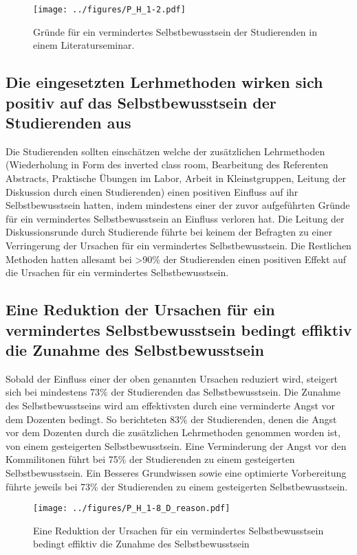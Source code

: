 \begin{figure}[h!]
\begin{center}
	\texttt{[image: ../figures/P\_H\_1-2.pdf]}
\end{center}
	\caption{Gründe für ein vermindertes Selbstbewusstsein der Studierenden in einem Literaturseminar.}
\end{figure}

\subsection{Die eingesetzten Lerhmethoden wirken sich positiv auf das Selbstbewusstsein der Studierenden aus}
Die Studierenden sollten einschätzen welche der  zusätzlichen Lehrmethoden (Wiederholung in Form des inverted class room, Bearbeitung des Referenten Abstracts, Praktische Übungen im Labor, Arbeit in Kleinstgruppen, Leitung der Diskussion durch einen Studierenden) einen positiven Einfluss auf ihr Selbstbewusstsein hatten, indem mindestens einer der zuvor aufgeführten Gründe für ein vermindertes Selbstbewusstsein an Einfluss verloren hat. Die Leitung der Diskussionsrunde durch Studierende führte bei keinem der Befragten zu einer Verringerung der Ursachen für ein vermindertes Selbstbewusstsein. Die Restlichen Methoden hatten allesamt bei >90\% der Studierenden einen positiven Effekt auf die Ursachen für ein vermindertes Selbstbewusstsein.

\subsection{Eine Reduktion der Ursachen für ein vermindertes Selbstbewusstsein bedingt effiktiv die Zunahme des Selbstbewusstsein}
Sobald der Einfluss einer der oben genannten Ursachen reduziert wird, steigert sich bei mindestens 73\% der Studierenden das Selbstbewusstsein. Die Zunahme des Selbstbewusstseins wird am effektivsten durch eine verminderte Angst vor dem Dozenten bedingt. So berichteten 83\% der Studierenden, denen die Angst vor dem Dozenten durch die zusätzlichen Lehrmethoden genommen worden ist, von einem gesteigerten Selbstbewusstsein. Eine Verminderung der Angst vor den Kommilitonen führt bei 75\% der Studierenden zu einem gesteigerten Selbstbewusstsein. Ein Besseres Grundwissen sowie eine optimierte Vorbereitung führte jeweils bei 73\% der Studierenden zu einem gesteigerten Selbstbewusstsein.
\begin{figure}[h!]
\begin{center}
	\texttt{[image: ../figures/P\_H\_1-8\_D\_reason.pdf]}
\end{center}
	\caption{Eine Reduktion der Ursachen für ein vermindertes Selbstbewusstsein bedingt effiktiv die Zunahme des Selbstbewusstsein}
\end{figure}

